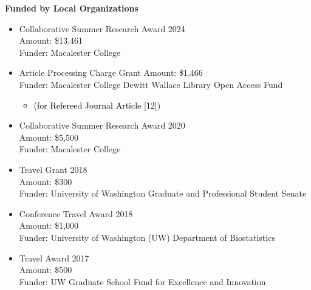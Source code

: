 \documentclass[margin]{res}
\newcommand{\annotateItem}[1]{
	\begin{itemize} \vspace{-0.1cm}
	\item[] 
	\begin{footnotesize}\textcolor{black}{(#1)}\end{footnotesize}
	\end{itemize} \vspace{-0.1cm}
}
\begin{document}
\begin{resume}
\textbf{Funded by Local Organizations} 
\begin{itemize}
\item Collaborative Summer Research Award \hfill 2024 \\
Amount: \$13,461\\
Funder: Macalester College


\item Article Processing Charge Grant %
Amount: \$1,466 \\
Funder: Macalester College Dewitt Wallace Library Open Access Fund
  \annotateItem{for Refereed Journal Article [12]}
  


\item Collaborative Summer Research Award  \hfill 2020 \\ %
Amount:  \$5,500 \\
Funder: Macalester College

\item Travel Grant  \hfill 2018 \\ 
Amount: \$300 \\
Funder: University of Washington Graduate and Professional Student Senate 

\item Conference Travel Award \hfill 2018 \\
Amount: \$1,000 \\
Funder: University of Washington (UW) Department of Biostatistics

\item Travel Award \hfill 2017 \\
Amount: \$500 \\
Funder: UW Graduate School Fund for Excellence and Innovation \\
\end{itemize}






\end{resume}
\end{document}
